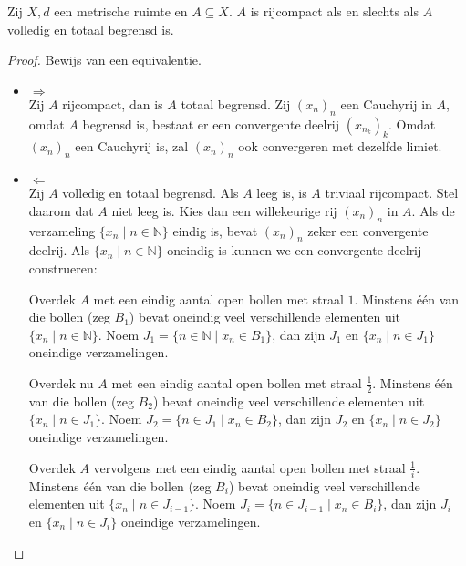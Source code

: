 \documentclass[main.tex]{subfiles}
\begin{document}
\iffalse
\begin{bst}
  Zij $X,d$ een metrische ruimte en $A \subseteq X$.
  $A$ is rijcompact als en slechts als $A$ volledig en totaal begrensd is.

  \begin{proof}
    Bewijs van een equivalentie.
    \begin{itemize}
    \item $\Rightarrow$\\
      Zij $A$ rijcompact, dan is $A$ totaal begrensd.
      Zij $(x_{n})_{n}$ een Cauchyrij in $A$, omdat $A$ begrensd is, bestaat er een convergente deelrij $(x_{n_{k}})_{k}$.
      Omdat $(x_{n})_{n}$ een Cauchyrij is, zal $(x_{n})_{n}$ ook convergeren met dezelfde limiet.
    \item $\Leftarrow$\\
      Zij $A$ volledig en totaal begrensd.
      Als $A$ leeg is, is $A$ triviaal rijcompact.
      Stel daarom dat $A$ niet leeg is.
      Kies dan een willekeurige rij $(x_{n})_{n}$ in $A$.
      Als de verzameling $\{x_{n}\mid n\in \mathbb{N}\}$ eindig is, bevat $(x_{n})_{n}$ zeker een convergente deelrij.
      Als $\{x_{n}\mid n\in \mathbb{N}\}$ oneindig is kunnen we een convergente deelrij construeren:
      
      Overdek $A$ met een eindig aantal open bollen met straal $1$.
      Minstens \'e\'en van die bollen (zeg $B_{1}$) bevat oneindig veel verschillende elementen uit $\{x_{n}\mid n\in \mathbb{N}\}$.
      Noem $J_{1}= \{n\in \mathbb{N} \mid x_{n}\in B_{1}\}$, dan zijn $J_{1}$ en $\{x_{n}\mid n\in J_{1}\}$ oneindige verzamelingen.
      
      Overdek nu $A$ met een eindig aantal open bollen met straal $\frac{1}{2}$.
      Minstens \'e\'en van die bollen (zeg $B_{2}$) bevat oneindig veel verschillende elementen uit $\{x_{n}\mid n\in J_{1}\}$.
      Noem $J_{2}= \{n\in J_{1} \mid x_{n}\in B_{2}\}$, dan zijn $J_{2}$ en $\{x_{n}\mid n\in J_{2}\}$ oneindige verzamelingen.

      Overdek $A$ vervolgens met een eindig aantal open bollen met straal $\frac{1}{i}$.
      Minstens \'e\'en van die bollen (zeg $B_{i}$) bevat oneindig veel verschillende elementen uit $\{x_{n}\mid n\in J_{i-1}\}$.
      Noem $J_{i}= \{n\in J_{i-1} \mid x_{n}\in B_{i}\}$, dan zijn $J_{i}$ en $\{x_{n}\mid n\in J_{i}\}$ oneindige verzamelingen.
      

\end{itemize}
\end{proof}
\end{bst}
\end{document}
